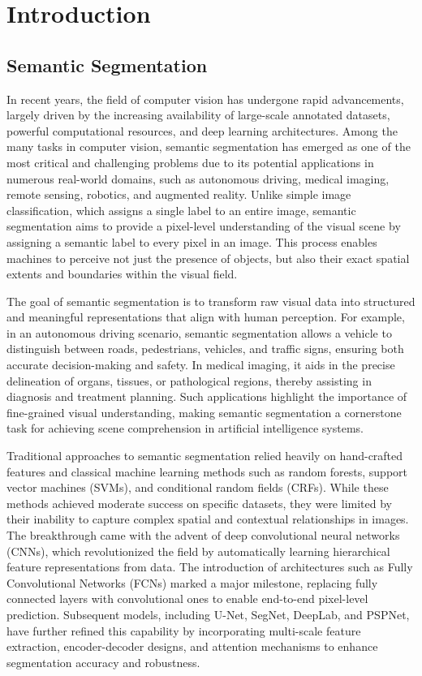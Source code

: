\chapter{Introduction}
\label{chap:introduction}

\section{Semantic Segmentation}
\label{sec:semantic_segmentation}
In recent years, the field of computer vision has undergone rapid advancements, largely driven by the increasing availability of large-scale annotated datasets, powerful computational resources, and deep learning architectures. Among the many tasks in computer vision, semantic segmentation has emerged as one of the most critical and challenging problems due to its potential applications in numerous real-world domains, such as autonomous driving, medical imaging, remote sensing, robotics, and augmented reality. Unlike simple image classification, which assigns a single label to an entire image, semantic segmentation aims to provide a pixel-level understanding of the visual scene by assigning a semantic label to every pixel in an image. This process enables machines to perceive not just the presence of objects, but also their exact spatial extents and boundaries within the visual field.

The goal of semantic segmentation is to transform raw visual data into structured and meaningful representations that align with human perception. For example, in an autonomous driving scenario, semantic segmentation allows a vehicle to distinguish between roads, pedestrians, vehicles, and traffic signs, ensuring both accurate decision-making and safety. In medical imaging, it aids in the precise delineation of organs, tissues, or pathological regions, thereby assisting in diagnosis and treatment planning. Such applications highlight the importance of fine-grained visual understanding, making semantic segmentation a cornerstone task for achieving scene comprehension in artificial intelligence systems.

Traditional approaches to semantic segmentation relied heavily on hand-crafted features and classical machine learning methods such as random forests, support vector machines (SVMs), and conditional random fields (CRFs). While these methods achieved moderate success on specific datasets, they were limited by their inability to capture complex spatial and contextual relationships in images. The breakthrough came with the advent of deep convolutional neural networks (CNNs), which revolutionized the field by automatically learning hierarchical feature representations from data. The introduction of architectures such as Fully Convolutional Networks (FCNs) marked a major milestone, replacing fully connected layers with convolutional ones to enable end-to-end pixel-level prediction. Subsequent models, including U-Net, SegNet, DeepLab, and PSPNet, have further refined this capability by incorporating multi-scale feature extraction, encoder-decoder designs, and attention mechanisms to enhance segmentation accuracy and robustness.

